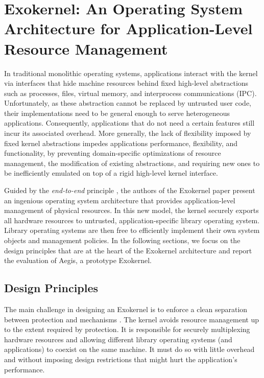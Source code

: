 \section{Exokernel: An Operating System Architecture for Application-Level Resource Management}

In traditional monolithic operating systems, applications interact with the kernel via interfaces that hide machine resources behind fixed high-level abstractions such as processes, files, virtual memory, and interprocess communications (IPC).
Unfortunately, as these abstraction cannot be replaced by untrusted user code, their implementations need to be general enough to serve heterogeneous applications.
Consequently, applications that do not need a certain features still incur its associated overhead.
More generally, the lack of flexibility imposed by fixed kernel abstractions impedes applications performance, flexibility, and functionality, by preventing domain-specific optimizations of resource management, the modification of existing abstractions, and requiring new ones to be inefficiently emulated on top of a rigid high-level kernel interface.

Guided by the \emph{end-to-end} principle \cite{DBLP:journals/tocs/SaltzerRC84}, the authors of the Exokernel paper \cite{DBLP:conf/sosp/EnglerKO95} present an ingenious operating system architecture that provides application-level management of physical resources.
In this new model, the kernel securely exports all hardware resources to untrusted, application-specific library operating system.
Library operating systems are then free to efficiently implement their own system objects and management policies.
In the following sections, we focus on the design principles that are at the heart of the Exokernel architecture and report the evaluation of Aegis, a prototype Exokernel.

\subsection{Design Principles}
The main challenge in designing an Exokernel is to enforce a clean separation between protection and mechanisms \cite{DBLP:journals/cacm/LampsonS76}.
The kernel avoids resource management up to the extent required by protection.
It is responsible for securely multiplexing hardware resources and allowing different library operating systems (and applications) to coexist on the same machine.
It must do so with little overhead and without imposing design restrictions that might hurt the application's performance.

